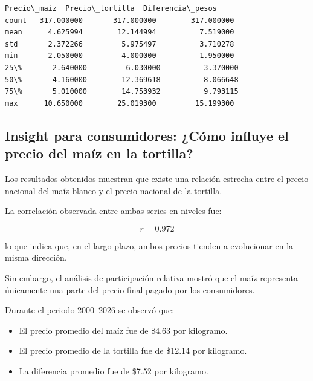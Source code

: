 \documentclass[11pt]{article}
\makeatletter
\providecommand{\tightlist}{%
      \setlength{\itemsep}{0pt}\setlength{\parskip}{0pt}}
\newcommand{\boxspacing}{\kern\kvtcb@left@rule\kern\kvtcb@boxsep}
\newcommand{\prompt}[4]{
        {\ttfamily\llap{{\color{#2}[#3]:\hspace{3pt}#4}}\vspace{-\baselineskip}}
    }
\makeatother
\begin{document}
            \begin{tcolorbox}[breakable, size=fbox, boxrule=.5pt, pad at break*=1mm, opacityfill=0]
\prompt{Out}{outcolor}{146}{\boxspacing}
\begin{Verbatim}[commandchars=\\\{\}]
       Precio\_maiz  Precio\_tortilla  Diferencia\_pesos
count   317.000000       317.000000        317.000000
mean      4.625994        12.144994          7.519000
std       2.372266         5.975497          3.710278
min       2.050000         4.000000          1.950000
25\%       2.640000         6.030000          3.370000
50\%       4.160000        12.369618          8.066648
75\%       5.010000        14.753932          9.793115
max      10.650000        25.019300         15.199300
\end{Verbatim}
\end{tcolorbox}
        
    \hypertarget{insight-para-consumidores-cuxf3mo-influye-el-precio-del-mauxedz-en-la-tortilla}{%
\subsection{Insight para consumidores: ¿Cómo influye el precio del maíz
en la
tortilla?}\label{insight-para-consumidores-cuxf3mo-influye-el-precio-del-mauxedz-en-la-tortilla}}

Los resultados obtenidos muestran que existe una relación estrecha entre
el precio nacional del maíz blanco y el precio nacional de la tortilla.

La correlación observada entre ambas series en niveles fue:

\[
r = 0.972
\]

lo que indica que, en el largo plazo, ambos precios tienden a
evolucionar en la misma dirección.

Sin embargo, el análisis de participación relativa mostró que el maíz
representa únicamente una parte del precio final pagado por los
consumidores.

Durante el periodo 2000--2026 se observó que:

\begin{itemize}
\tightlist
\item
  El precio promedio del maíz fue de \$4.63 por kilogramo.
\item
  El precio promedio de la tortilla fue de \$12.14 por kilogramo.
\item
  La diferencia promedio fue de \$7.52 por kilogramo.
\end{itemize}
\end{document}
